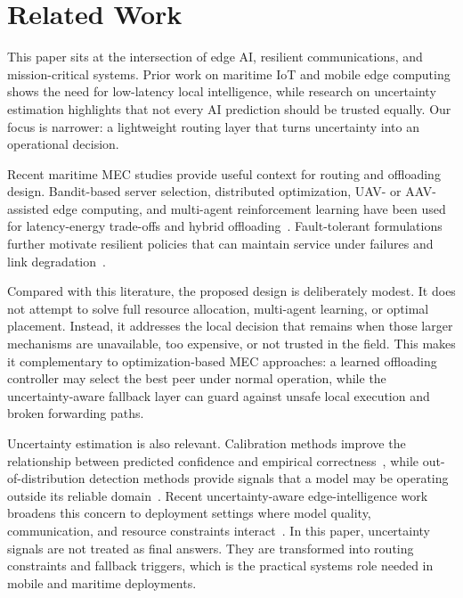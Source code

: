\documentclass[10pt, conference]{IEEEtran}
\begin{document}
\section{Related Work}
This paper sits at the intersection of edge AI, resilient communications, and mission-critical systems. Prior work on maritime IoT and mobile edge computing shows the need for low-latency local intelligence, while research on uncertainty estimation highlights that not every AI prediction should be trusted equally. Our focus is narrower: a lightweight routing layer that turns uncertainty into an operational decision.

Recent maritime MEC studies provide useful context for routing and offloading design. Bandit-based server selection, distributed optimization, UAV- or AAV-assisted edge computing, and multi-agent reinforcement learning have been used for latency-energy trade-offs and hybrid offloading~\cite{yang2022mab_maritime,you2025joint_maritime,he2025distributed_maritime,kong2025satd3_maritime,ning2025marho}. Fault-tolerant formulations further motivate resilient policies that can maintain service under failures and link degradation~\cite{zhang2024fault_tolerant_edge}.

Compared with this literature, the proposed design is deliberately modest. It does not attempt to solve full resource allocation, multi-agent learning, or optimal placement. Instead, it addresses the local decision that remains when those larger mechanisms are unavailable, too expensive, or not trusted in the field. This makes it complementary to optimization-based MEC approaches: a learned offloading controller may select the best peer under normal operation, while the uncertainty-aware fallback layer can guard against unsafe local execution and broken forwarding paths.

Uncertainty estimation is also relevant. Calibration methods improve the relationship between predicted confidence and empirical correctness~\cite{guo2017calibration}, while out-of-distribution detection methods provide signals that a model may be operating outside its reliable domain~\cite{hendrycks2017baseline}. Recent uncertainty-aware edge-intelligence work broadens this concern to deployment settings where model quality, communication, and resource constraints interact~\cite{zhang2022edgeuncertainty,wang2023adaptiveoffload}. In this paper, uncertainty signals are not treated as final answers. They are transformed into routing constraints and fallback triggers, which is the practical systems role needed in mobile and maritime deployments.
\end{document}
